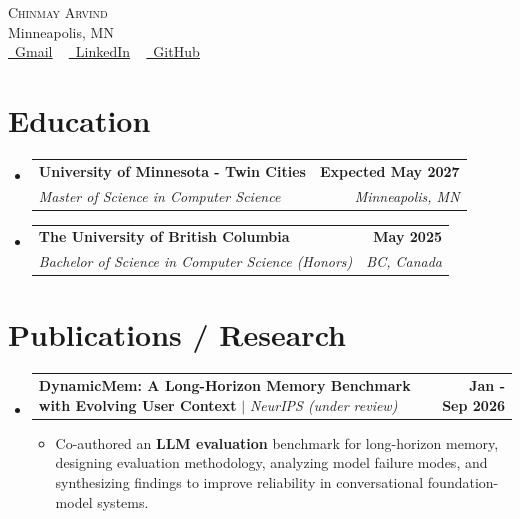 \documentclass[letterpaper,11pt]{article}
\makeatletter
\newcommand{\resumeItem}[1]{
  \item\small{
    {#1 \vspace{-2pt}}
  }
}
\newcommand{\resumeSubheading}[4]{
  \vspace{-2pt}\item
    \begin{tabular*}{1.0\textwidth}[t]{l@{\extracolsep{\fill}}r}
      \textbf{#1} & \textbf{\small #2} \\
      \textit{\small#3} & \textit{\small #4} \\
    \end{tabular*}\vspace{-7pt}
}
\newcommand{\resumeProjectHeading}[2]{
    \item
    \begin{tabular*}{1.001\textwidth}{l@{\extracolsep{\fill}}r}
      \small#1 & \textbf{\small #2}\\
    \end{tabular*}\vspace{-7pt}
}
\newcommand{\resumeSubHeadingListStart}{\begin{itemize}[leftmargin=0.0in, label={}]}
\newcommand{\resumeSubHeadingListEnd}{\end{itemize}}
\newcommand{\resumeItemListStart}{\begin{itemize}}
\newcommand{\resumeItemListEnd}{\end{itemize}\vspace{-5pt}}
\makeatother
\begin{document}

\begin{center}
    {\Huge \scshape Chinmay Arvind} \\ \vspace{1pt}
    Minneapolis, MN \\ \vspace{1pt}
    \href{mailto:chinmayarvind23@gmail.com}{\raisebox{-0.2\height}{\faEnvelope}\ \underline{Gmail}} ~
    \href{https://www.linkedin.com/in/chinmay-arvind1/}{\raisebox{-0.2\height}{\faLinkedin}\ \underline{LinkedIn}} ~
    \href{https://github.com/chinmayarvind23}{\raisebox{-0.2\height}{\faGithub}\ \underline{GitHub}}
    \vspace{-8pt}
\end{center}


\section{Education}
  \resumeSubHeadingListStart
    \resumeSubheading
      {University of Minnesota - Twin Cities}{Expected May 2027}
      {Master of Science in Computer Science}{Minneapolis, MN}
    \resumeSubheading
      {The University of British Columbia}{May 2025}
      {Bachelor of Science in Computer Science (Honors)}{BC, Canada}
  \resumeSubHeadingListEnd

\section{Publications / Research}
\vspace{-5pt}
\resumeSubHeadingListStart
  \resumeProjectHeading
    {{\textbf{DynamicMem: A Long-Horizon Memory Benchmark with Evolving User Context}} $|$ \emph{NeurIPS (under review)}}{Jan - Sep 2026}
    \resumeItemListStart
      \resumeItem{Co-authored an \textbf{LLM evaluation} benchmark for long-horizon memory, designing evaluation methodology, analyzing model failure modes, and synthesizing findings to improve reliability in conversational foundation-model systems.}
    \resumeItemListEnd
\resumeSubHeadingListEnd
\vspace{-15pt}
\end{document}
